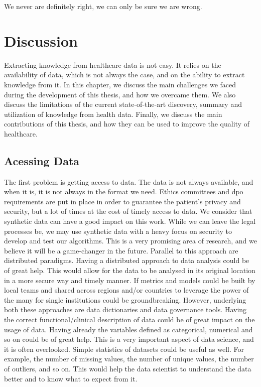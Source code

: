 \begin{savequote}[75mm]
We never are definitely right, we can only be sure we are wrong.
\end{savequote}
\chapter{Discussion} \label{chap:disc}


Extracting knowledge from healthcare data is not easy. It relies on the availability of data, which is not always the case, and on the ability to extract knowledge from it. In this chapter, we discuss the main challenges we faced during the development of this thesis, and how we overcame them. We also discuss the limitations of the current state-of-the-art discovery, summary and utilization of knowledge from health data. Finally, we discuss the main contributions of this thesis, and how they can be used to improve the quality of healthcare.

\section{Acessing Data}
The first problem is getting access to data. The data is not always available, and when it is, it is not always in the format we need. Ethics committees and \ac{dpo} requirements are put in place in order to guarantee the patient's privacy and security, but a lot of times at the cost of timely access to data. We consider that synthetic data can have a good impact on this work. While we can leave the legal processes be, we may use synthetic data with a heavy focus on security to develop and test our algorithms. This is a very promising area of research, and we believe it will be a game-changer in the future.
Parallel to this approach are distributed paradigms. Having a distributed approach to data analysis could be of great help. This would allow for the data to be analysed in its original location in a more secure way and timely manner. If metrics and models could be built by local teams and shared across regions and/or countries to leverage the power of the many for single institutions could be groundbreaking. However, underlying both these approaches are data dictionaries and data governance tools. Having the correct functional/clinical description of data could be of great impact on the usage of data. Having already the variables defined as categorical, numerical and so on could be of great help. This is a very important aspect of data science, and it is often overlooked. Simple statistics of datasets could be useful as well. For example, the number of missing values, the number of unique values, the number of outliers, and so on. This would help the data scientist to understand the data better and to know what to expect from it. 

